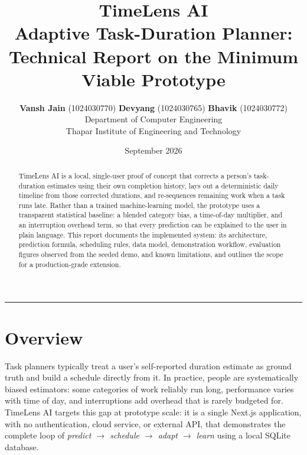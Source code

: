 \documentclass[11pt,a4paper]{article}
\title{\textbf{\Large TimeLens AI}\\[0.3em]
\large Adaptive Task-Duration Planner: Technical Report on the Minimum Viable Prototype}
\author{
    \textbf{Vansh Jain} (1024030770) \quad
    \textbf{Devyang} (1024030765) \quad
    \textbf{Bhavik} (1024030772)\\[0.5em]
    \small Department of Computer Engineering\\
    \small Thapar Institute of Engineering and Technology
}
\date{September 2026}
\begin{document}
\maketitle
\hrule
\vspace{1.5em}

\begin{abstract}
\noindent TimeLens AI is a local, single-user proof of concept that corrects a person's task-duration
estimates using their own completion history, lays out a deterministic daily timeline from those
corrected durations, and re-sequences remaining work when a task runs late. Rather than a trained
machine-learning model, the prototype uses a transparent statistical baseline: a blended category
bias, a time-of-day multiplier, and an interruption overhead term, so that every prediction can be
explained to the user in plain language. This report documents the implemented system: its
architecture, prediction formula, scheduling rules, data model, demonstration workflow, evaluation
figures observed from the seeded demo, and known limitations, and outlines the scope for a
production-grade extension.
\end{abstract}

\section{Overview}
Task planners typically treat a user's self-reported duration estimate as ground truth and build a
schedule directly from it. In practice, people are systematically biased estimators: some categories
of work reliably run long, performance varies with time of day, and interruptions add overhead that is
rarely budgeted for. TimeLens AI targets this gap at prototype scale: it is a single Next.js
application, with no authentication, cloud service, or external API, that demonstrates the complete
loop of \emph{predict $\rightarrow$ schedule $\rightarrow$ adapt $\rightarrow$ learn} using a local
SQLite database.
\end{document}
